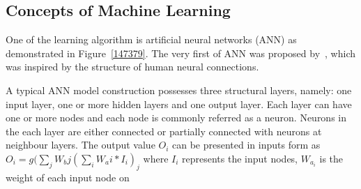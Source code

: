 \subsection{Concepts of Machine Learning}
One of the learning algorithm is artificial neural networks (ANN) as demonstrated in Figure~\ref{147379}. The very first of ANN was proposed by~\citet{McCulloch_1943}, which was inspired by the structure of human neural connections. 
\par 
A typical ANN model construction possesses three structural layers, namely: one input layer, one or more hidden layers and one output layer. Each layer can have one or more nodes and each node is commonly referred as a neuron. Neurons in the each layer are either connected or partially connected with neurons at neighbour layers. The output value $O_i$ can be presented in inputs form as
$O_i = g( \sum_{j} W_bj(\sum_{i} W_ai * I_i)_j$
where $I_i$ represents the input nodes, $W_a_i$ is the weight of each input node on 